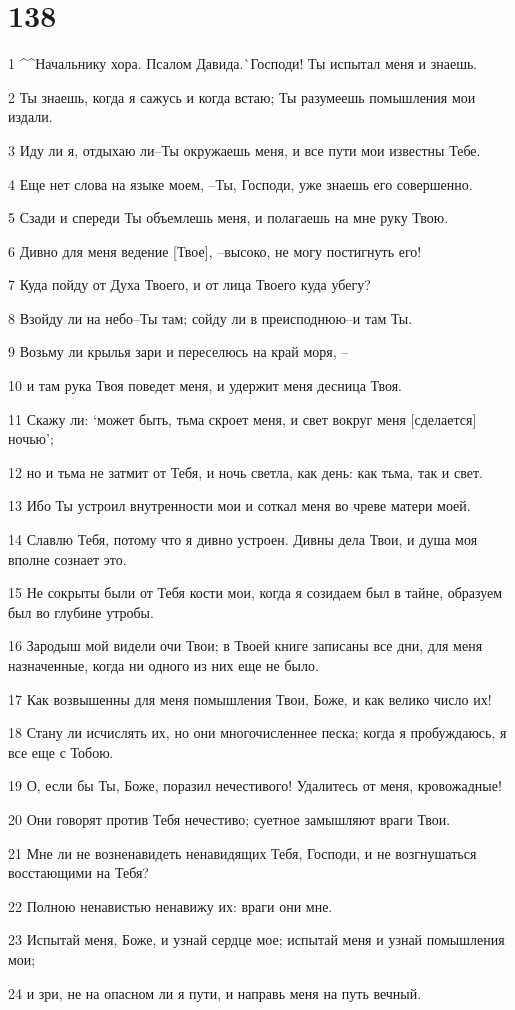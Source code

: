 \chapter{138}

\par 1 ^^Начальнику хора. Псалом Давида.^^ Господи! Ты испытал меня и знаешь.
\par 2 Ты знаешь, когда я сажусь и когда встаю; Ты разумеешь помышления мои издали.
\par 3 Иду ли я, отдыхаю ли--Ты окружаешь меня, и все пути мои известны Тебе.
\par 4 Еще нет слова на языке моем, --Ты, Господи, уже знаешь его совершенно.
\par 5 Сзади и спереди Ты объемлешь меня, и полагаешь на мне руку Твою.
\par 6 Дивно для меня ведение [Твое], --высоко, не могу постигнуть его!
\par 7 Куда пойду от Духа Твоего, и от лица Твоего куда убегу?
\par 8 Взойду ли на небо--Ты там; сойду ли в преисподнюю--и там Ты.
\par 9 Возьму ли крылья зари и переселюсь на край моря, --
\par 10 и там рука Твоя поведет меня, и удержит меня десница Твоя.
\par 11 Скажу ли: `может быть, тьма скроет меня, и свет вокруг меня [сделается] ночью';
\par 12 но и тьма не затмит от Тебя, и ночь светла, как день: как тьма, так и свет.
\par 13 Ибо Ты устроил внутренности мои и соткал меня во чреве матери моей.
\par 14 Славлю Тебя, потому что я дивно устроен. Дивны дела Твои, и душа моя вполне сознает это.
\par 15 Не сокрыты были от Тебя кости мои, когда я созидаем был в тайне, образуем был во глубине утробы.
\par 16 Зародыш мой видели очи Твои; в Твоей книге записаны все дни, для меня назначенные, когда ни одного из них еще не было.
\par 17 Как возвышенны для меня помышления Твои, Боже, и как велико число их!
\par 18 Стану ли исчислять их, но они многочисленнее песка; когда я пробуждаюсь, я все еще с Тобою.
\par 19 О, если бы Ты, Боже, поразил нечестивого! Удалитесь от меня, кровожадные!
\par 20 Они говорят против Тебя нечестиво; суетное замышляют враги Твои.
\par 21 Мне ли не возненавидеть ненавидящих Тебя, Господи, и не возгнушаться восстающими на Тебя?
\par 22 Полною ненавистью ненавижу их: враги они мне.
\par 23 Испытай меня, Боже, и узнай сердце мое; испытай меня и узнай помышления мои;
\par 24 и зри, не на опасном ли я пути, и направь меня на путь вечный.

